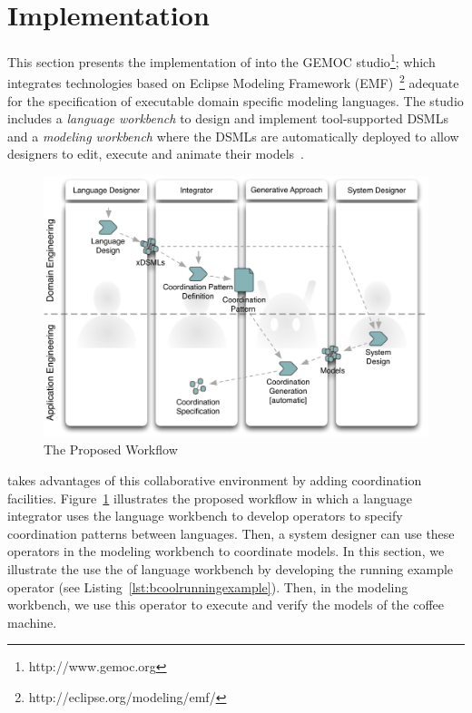\section{Implementation}
\label{section:bcoollengbench}
This section presents the implementation of \bcool into the GEMOC studio\footnote{http://www.gemoc.org}; which integrates technologies based on Eclipse Modeling Framework (EMF)~\footnote{http://eclipse.org/modeling/emf/} adequate for the specification of executable domain specific modeling languages. The studio includes a \emph{language workbench} to design and implement tool-supported DSMLs and a \emph{modeling workbench} where the DSMLs are automatically deployed to allow designers to edit, execute and animate their models~\cite{ttc15bib}.

\begin{figure}
	\begin{center}
		\includegraphics[width=.6\textwidth]{bcool/figs/process}
		\caption{The Proposed Workflow}
		\label{fig:proposedworkflow}
	\end{center}
\end{figure}

\bcool takes advantages of this collaborative environment by adding coordination facilities. Figure~\ref{fig:proposedworkflow} illustrates the proposed workflow in which a language integrator uses the language workbench to develop \bcool operators to specify coordination patterns between languages. Then, a system designer can use these operators in the modeling workbench to coordinate models. In this section, we illustrate the use the of language workbench by developing the running example operator (see Listing~\ref{lst:bcoolrunningexample}). Then, in the modeling workbench, we use this operator to execute and verify the models of the coffee machine. 

